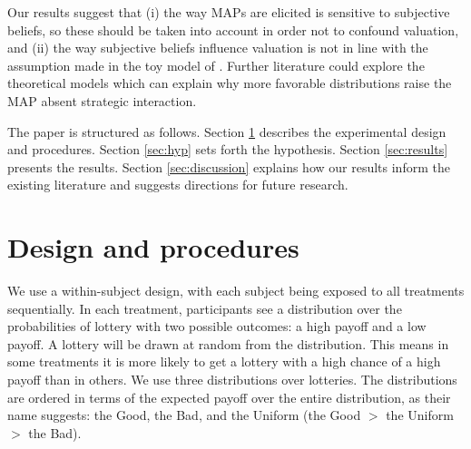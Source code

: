 


Our results suggest that (i) the way MAPs are elicited is sensitive to subjective beliefs, so these should be taken into account in order not to confound valuation, and (ii) the way subjective beliefs influence valuation is not in line with the assumption made in the toy model of \cite{Li2020a}.
Further literature could explore the theoretical models which can explain why more favorable distributions raise the MAP absent strategic interaction.


The paper is structured as follows.
Section \ref{sec:proced} describes the experimental design and procedures.
Section \ref{sec:hyp} sets forth the hypothesis.
Section \ref{sec:results} presents the results.
Section \ref{sec:discussion} explains how our results inform the existing literature and suggests directions for future research.


\section{Design and procedures}\label{sec:proced}
We use a within-subject design, with each subject being exposed to all treatments sequentially.
In each treatment, participants see a distribution over the probabilities of lottery with two possible outcomes: a high payoff and a low payoff.
A lottery will be drawn at random from the distribution.
This means in some treatments it is more likely to get a lottery with a high chance of a high payoff than in others.
We use three distributions over lotteries.
The distributions are ordered in terms of the expected payoff over the entire distribution, as their name suggests: the Good, the Bad, and the Uniform (the Good $>$ the Uniform $>$ the Bad).

